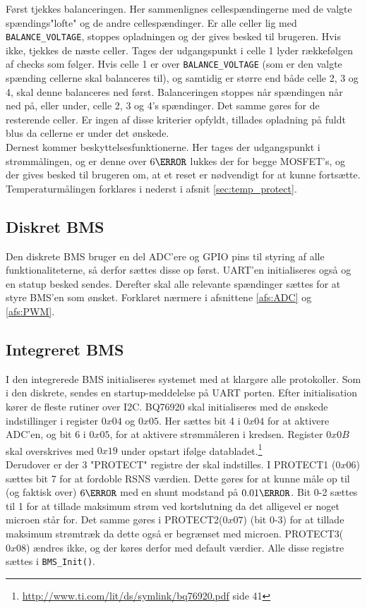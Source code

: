 Først tjekkes balanceringen. Her sammenlignes cellespændingerne med de valgte spændings"lofte" \space og de andre cellespændinger. Er alle celler lig med \verb|BALANCE_VOLTAGE|, stoppes opladningen og der gives besked til brugeren. Hvis ikke, tjekkes de næste celler. Tages der udgangspunkt i celle 1 lyder rækkefølgen af checks som følger. Hvis celle 1 er over \verb|BALANCE_VOLTAGE| (som er den valgte spænding cellerne skal balanceres til), og samtidig er større end både celle 2, 3 og 4, skal denne balanceres ned først. Balanceringen stoppes når spændingen når ned på, eller under, celle 2, 3 og 4's spændinger. Det samme gøres for de resterende celler. Er ingen af disse kriterier opfyldt, tillades opladning på fuldt blus da cellerne er under det ønskede.\\

Dernest kommer beskyttelsesfunktionerne. Her tages der udgangspunkt i strømmålingen, og er denne over $6\ampere$ lukkes der for begge MOSFET's, og der gives besked til brugeren om, at et reset er nødvendigt for at kunne fortsætte. \\

Temperaturmålingen forklares i nederst i afsnit \ref{sec:temp_protect}.

\subsection{Diskret BMS}
Den diskrete BMS bruger en del ADC'ere og GPIO pins til styring af alle funktionaliteterne, så derfor sættes disse op først. UART'en initialiseres også og en statup besked sendes. Derefter skal alle relevante spændinger sættes for at styre BMS'en som ønsket. Forklaret nærmere i afsnittene \ref{afs:ADC} og \ref{afs:PWM}.

\subsection{Integreret BMS}
I den integrerede BMS initialiseres systemet med at klargøre alle protokoller. Som i den diskrete, sendes en startup-meddelelse på UART porten. Efter initialisation kører de fleste rutiner over I2C. BQ76920 skal initialiseres med de ønskede indstillinger i register $0x04$ og $0x05$. Her sættes bit 4 i $0x04$ for at aktivere ADC'en, og bit 6 i $0x05$, for at aktivere strømmåleren i kredsen. Register $0x0B$ skal overskrives med $0x19$ under opstart ifølge databladet.\footnote{\url{http://www.ti.com/lit/ds/symlink/bq76920.pdf} side 41} \\

Derudover er der 3 "PROTECT" \space registre der skal indstilles. I PROTECT1 ($0x06$) sættes bit 7 for at fordoble RSNS værdien. Dette gøres for at kunne måle op til (og faktisk over) $6\ampere$ med en shunt modstand på $0.01\ohm$. Bit 0-2 sættes til 1 for at tillade maksimum strøm ved kortslutning da det alligevel er noget microen står for. Det samme gøres i PROTECT2($0x07$) (bit 0-3) for at tillade maksimum strømtræk da dette også er begrænset med microen. PROTECT3($0x08$) ændres ikke, og der køres derfor med default værdier. Alle disse registre sættes i \verb|BMS_Init()|.

